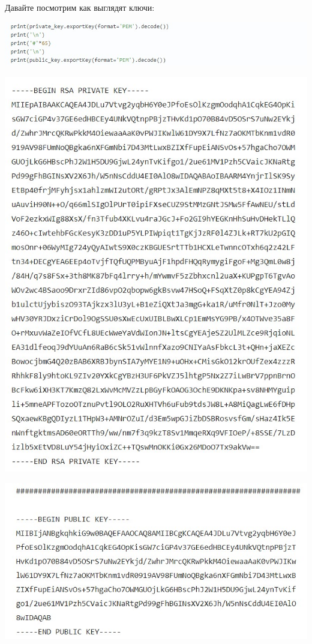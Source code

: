 \documentclass[12pt]{article}
\begin{document}
	Давайте посмотрим как выглядят ключи:
	
		\begin{center}
		\includegraphics[width=1\linewidth]{pictures/code6.jpg}
	\end{center}

	\begin{center}
		\includegraphics[width=1\linewidth]{pictures/key1.jpg}
	\end{center}

\begin{center}
	\includegraphics[width=1\linewidth]{pictures/key2.jpg}
\end{center}
\end{document}
